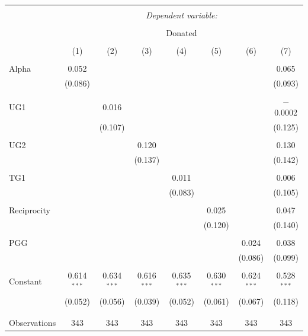 \documentclass[12pt]{article}
\begin{document}
\begin{table}[!htbp] \centering 
  \caption{} 
  \label{} 
          \begin{adjustbox}{width=\textwidth}
\begin{tabular}{@{\extracolsep{5pt}}lccccccc} 
\\[-1.8ex]\hline 
\hline \\[-1.8ex] 
 & \multicolumn{7}{c}{\textit{Dependent variable:}} \\ 
\cline{2-8} 
\\[-1.8ex] & \multicolumn{7}{c}{Donated} \\ 
\\[-1.8ex] & (1) & (2) & (3) & (4) & (5) & (6) & (7)\\ 
\hline \\[-1.8ex] 
 Alpha & 0.052 &  &  &  &  &  & 0.065 \\ 
  & (0.086) &  &  &  &  &  & (0.093) \\ 
  & & & & & & & \\ 
 UG1 &  & 0.016 &  &  &  &  & $-$0.0002 \\ 
  &  & (0.107) &  &  &  &  & (0.125) \\ 
  & & & & & & & \\ 
 UG2 &  &  & 0.120 &  &  &  & 0.130 \\ 
  &  &  & (0.137) &  &  &  & (0.142) \\ 
  & & & & & & & \\ 
 TG1 &  &  &  & 0.011 &  &  & 0.006 \\ 
  &  &  &  & (0.083) &  &  & (0.105) \\ 
  & & & & & & & \\ 
 Reciprocity &  &  &  &  & 0.025 &  & 0.047 \\ 
  &  &  &  &  & (0.120) &  & (0.140) \\ 
  & & & & & & & \\ 
 PGG &  &  &  &  &  & 0.024 & 0.038 \\ 
  &  &  &  &  &  & (0.086) & (0.099) \\ 
  & & & & & & & \\ 
 Constant & 0.614$^{***}$ & 0.634$^{***}$ & 0.616$^{***}$ & 0.635$^{***}$ & 0.630$^{***}$ & 0.624$^{***}$ & 0.528$^{***}$ \\ 
  & (0.052) & (0.056) & (0.039) & (0.052) & (0.061) & (0.067) & (0.118) \\ 
  & & & & & & & \\ 
\hline \\[-1.8ex] 
Observations & 343 & 343 & 343 & 343 & 343 & 343 & 343 \\ 

\end{tabular}
\end{adjustbox}
\end{table}
\end{document}
